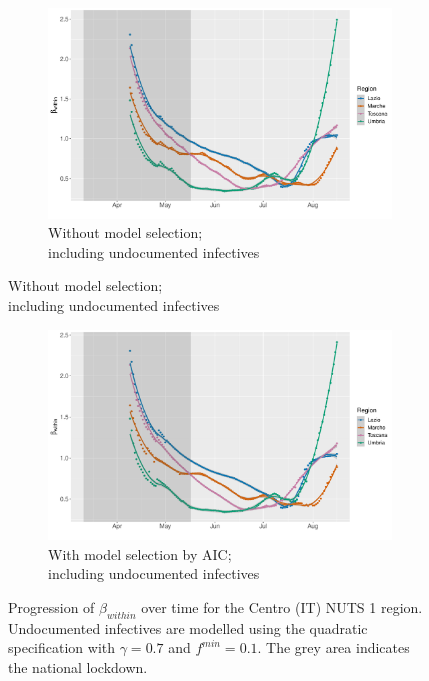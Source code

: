 \documentclass[12pt]{article}
\begin{document}
\begin{appendices}
\begin{figure}[H]
\begin{subfigure}{\textwidth}
    	    \end{subfigure}
    	\end{figure}
        \begin{figure}[H]\ContinuedFloat
    	    \begin{subfigure}{\textwidth}
    	      \centering
    	      \includegraphics[width=0.94\linewidth]{output/model_within_lag14_betawithin_Centro (IT)_UndocQuadratic_rollingwindow30.pdf}
    	      \caption{Without model selection; \\ including undocumented infectives}
    	      \label{fig:beta_within_over_time_centro_lowsample_regular_undoc}
    	    \end{subfigure}\newline
        \end{figure}
        \begin{figure}[H]\ContinuedFloat
    	    \begin{subfigure}{\textwidth}
    	      \centering
    	      \includegraphics[width=0.94\linewidth]{output/model_within_lag14_betawithin_Centro (IT)_aic_UndocQuadratic_rollingwindow30.pdf}
    	      \caption{With model selection by AIC; \\ including undocumented infectives}
    	      \label{fig:beta_within_over_time_centro_lowsample_aic_undoc}
    	    \end{subfigure}
    	    \caption{Progression of $\beta_{within}$ over time for the Centro (IT) NUTS 1 region. Undocumented infectives are modelled using the quadratic specification with $\gamma = 0.7$ and $f^{min}=0.1$. The grey area indicates the national lockdown.}
    	    \label{fig:beta_within_over_time_centro_lowsample}
	    \end{figure}
		

\end{appendices}
\end{document}
